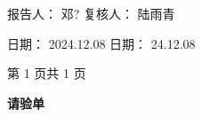 \documentclass[UTF8,10pt,a4paper,fontset=fandol]{ctexart}
\newcommand{\fieldvalue}[1]{#1}
\newcommand{\handwritten}[1]{#1}
\begin{document}
\vspace{1em}

\noindent
报告人：
\fieldvalue{\handwritten{邓?}}
\hfill
复核人：
\fieldvalue{\handwritten{陆雨青}}

\vspace{0.8em}

\noindent
日\quad 期：
\fieldvalue{\handwritten{2024.12.08}}
\hfill
日\quad 期：
\fieldvalue{\handwritten{24.12.08}}

\vfill

\begin{center}
第 1 页\quad 共 1 页
\end{center}

\newpage

\begin{center}
\textbf{请验单}
\end{center}
\end{document}
